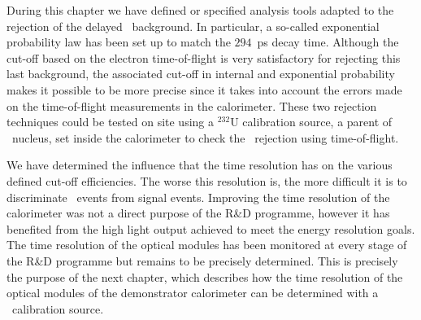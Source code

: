 During this chapter we have defined or specified analysis tools adapted to the rejection of the delayed \Tl\ background.
In particular, a so-called exponential probability law has been set up to match the $294$~ps decay time.
Although the cut-off based on the electron time-of-flight is very satisfactory for rejecting this last background, the associated cut-off in internal and exponential probability makes it possible to be more precise since it takes into account the errors made on the time-of-flight measurements in the calorimeter.
These two rejection techniques could be tested on site using a $^{232}$U calibration source, a parent of \Tl\ nucleus, set inside the calorimeter to check the \Tl\ rejection using time-of-flight.

We have determined the influence that the time resolution has on the various defined cut-off efficiencies.
The worse this resolution is, the more difficult it is to discriminate \Tl\ events from signal events.
Improving the time resolution of the calorimeter was not a direct purpose of the R\&D programme, however it has benefited from the high light output achieved to meet the energy resolution goals.
The time resolution of the optical modules has been monitored at every stage of the R\&D programme but remains to be precisely determined.
This is precisely the purpose of the next chapter, which describes how the time resolution of the optical modules of the demonstrator calorimeter can be determined with a \Co\ calibration source.
